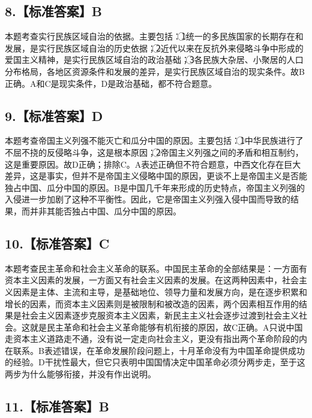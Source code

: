 \documentclass[UTF8,11pt]{ctexart}
\begin{document}
\subsection*{8.【标准答案】B}

本题考查实行民族区域自治的依据。主要包括：\textcircled{1}统一的多民族国家的长期存在和发展，是实行民族区域自治的历史依据；\textcircled{2}近代以来在反抗外来侵略斗争中形成的爱国主义精神，是实行民族区域自治的政治基础；\textcircled{3}各民族大杂居、小聚居的人口分布格局，各地区资源条件和发展的差异，是实行民族区域自治的现实条件。故B正确。A和C是现实条件，D是政治基础，都不符合题意。


\subsection*{9.【标准答案】D}

本题考查帝国主义列强不能灭亡和瓜分中国的原因。主要包括：\textcircled{1}中华民族进行了不屈不挠的反侵略斗争，这是根本原因；\textcircled{2}帝国主义列强之间的矛盾和相互制约，这是重要原因。故D正确；排除C。A表述正确但不符合题意，中西文化存在巨大差异，这是事实，但并不是帝国主义侵略中国的原因，更谈不上是帝国主义是否能独占中国、瓜分中国的原因。B是中国几千年来形成的历史特点，帝国主义列强的入侵进一步加剧了这种不平衡性。因此，它是帝国主义列强入侵中国而导致的结果，而并非其能否独占中国、瓜分中国的原因。


\subsection*{10.【标准答案】C}

本题考查民主革命和社会主义革命的联系。中国民主革命的全部结果是：一方面有资本主义因素的发展，一方面又有社会主义因素的发展。在这两种因素中，社会主义因素是主体、主流和主导，是基础地位、领导力量和发展方向，是在逐步积累和增长的因素，而资本主义因素则是被限制和被改造的因素，两个因素相互作用的结果是社会主义因素逐步克服资本主义因素，新民主主义社会逐步过渡到社会主义社会。这就是民主革命和社会主义革命能够有机衔接的原因，故C正确。A只说中国走资本主义道路走不通，没有说一定走向社会主义，更没有指出两个革命阶段的内在联系。B表述错误，在革命发展阶段问题上，十月革命没有为中国革命提供成功的经验。D干扰性最大，但它只表明中国国情决定中国革命必须分两步走，至于这两步为什么能够衔接，并没有作出说明。


\subsection*{11.【标准答案】B}
\end{document}
